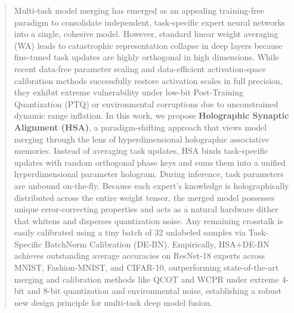 \documentclass{article}
\theoremstyle{plain}
\theoremstyle{definition}
\theoremstyle{remark}
\begin{document}

\printAffiliationsAndNotice{}

\begin{abstract}
  Multi-task model merging has emerged as an appealing training-free paradigm to consolidate independent, task-specific expert neural networks into a single, cohesive model. However, standard linear weight averaging (WA) leads to catastrophic representation collapse in deep layers because fine-tuned task updates are highly orthogonal in high dimensions. While recent data-free parameter scaling and data-efficient activation-space calibration methods successfully restore activation scales in full precision, they exhibit extreme vulnerability under low-bit Post-Training Quantization (PTQ) or environmental corruptions due to unconstrained dynamic range inflation. In this work, we propose \textbf{Holographic Synaptic Alignment (HSA)}, a paradigm-shifting approach that views model merging through the lens of hyperdimensional holographic associative memories. Instead of averaging task updates, HSA binds task-specific updates with random orthogonal phase keys and sums them into a unified hyperdimensional parameter hologram. During inference, task parameters are unbound on-the-fly. Because each expert's knowledge is holographically distributed across the entire weight tensor, the merged model possesses unique error-correcting properties and acts as a natural hardware dither that whitens and disperses quantization noise. Any remaining crosstalk is easily calibrated using a tiny batch of 32 unlabeled samples via Task-Specific BatchNorm Calibration (DE-BN). Empirically, HSA+DE-BN achieves outstanding average accuracies on ResNet-18 experts across MNIST, Fashion-MNIST, and CIFAR-10, outperforming state-of-the-art merging and calibration methods like QCOT and WCPR under extreme 4-bit and 8-bit quantization and environmental noise, establishing a robust new design principle for multi-task deep model fusion.
\end{abstract}
\end{document}
